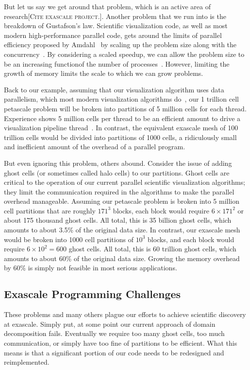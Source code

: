 \documentclass[conference]{IEEEtran}
\newcommand*{\lcite}[1]{~\cite{#1}}
\newcommand{\fix}[1]{{\color{red}\textsc{[#1]}}}
\begin{document}
But let us say we get around that problem, which is an active area of
research\fix{Cite exascale project.}.  Another problem that we run into is
the breakdown of Gustafson's law.  Scientific visualization code, as well
as most modern high-performance parallel code, gets around the limits of
parallel efficiency proposed by Amdahl\lcite{Amdahl1967} by scaling up the
problem size along with the concurrency\lcite{Gustafson1988}.  By
considering a scaled speedup, we can allow the problem size to be an
increasing functionof the number of processes\lcite{Quinn2004}.  However,
limiting the growth of memory limits the scale to which we can grow
problems.

Back to our example, assuming that our visualization algorithm uses data
parallelism, which most modern visualization algorithms
do\lcite{Moreland2012:TVCG}, our 1 trillion cell petascale problem will be
broken into partitions of 5 million cells for each thread.  Experience
shows 5 million cells per thread to be an efficient amount to drive a
visualization pipeline thread\lcite{ParaViewTutorial}.  In contrast, the
equivalent exascale mesh of 100 trillion cells would be divided into
partitions of 1000 cells, a ridiculously small and inefficient amount of
the overhead of a parallel program.

But even ignoring this problem, others abound.  Consider the issue of
adding ghost cells (or sometimes called halo cells) to our partitions.
Ghost cells are critical to the operation of our current parallel
scientific visualization algorithms; they limit the communication required
in the algorithms to make the parallel overhead manageable.  Assuming our
petascale problem is broken into 5 million cell partitions that are roughly
$171^3$ blocks, each block would require $6 \times 171^2$ or about 175
thousand ghost cells.  All total, this is 35 billion ghost cells, which
amounts to about 3.5\% of the original data size.  In contrast, our
exascale mesh would be broken into 1000 cell partitions of $10^3$ blocks,
and each block would require $6 \times 10^2 = 600$ ghost cells.  All total,
this is 60 trillion ghost cells, which amounts to about 60\% of the
original data size.  Growing the memory overhead by 60\% is simply not
feasible in most serious applications.

\subsection{Exascale Programming Challenges}

\noindent
These problems and many others plague our efforts to achieve scientific
discovery at exascale.  Simply put, at some point our current approach of
domain decomposition fails.  Eventually we require too many ghost cells,
too much communication, or simply have too fine of partitions to be
efficient.  What this means is that a significant portion of our code needs
to be redesigned and reimplemented.
\end{document}
